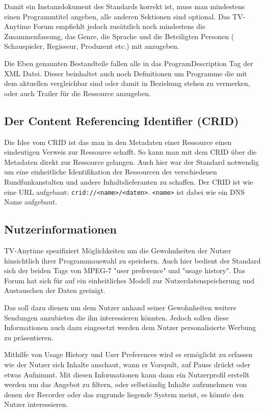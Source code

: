 	Damit ein Instanzdokument des Standards korrekt ist, muss man mindestens einen Programmtitel angeben, alle anderen Sektionen sind optional. Das TV-Anytime Forum empfiehlt jedoch zusätzlich noch mindestens die Zusammenfassung, das Genre, die Sprache und die Beteiligten Personen ( Schauspieler, Regisseur, Produzent etc.) mit anzugeben.
	
	Die Eben genannten Bestandteile fallen alle in das ProgramDescription Tag der XML Datei. Dieser beinhaltet auch noch Definitionen um Programme die mit dem aktuellen vergleichbar sind oder damit in Beziehung stehen zu vermerken, oder auch Trailer für die Ressource anzugeben.
 
 \subsection{Der Content Referencing Identifier (CRID)}
	Die Idee vom CRID ist das man in den Metadaten einer Ressource einen eindeutigen Verweis zur Ressource schafft. So kann man mit dem CRID über die Metadaten direkt zur Ressource gelangen. Auch hier war der Standard notwendig um eine einheitliche Identifikation der Ressourcen der verschiedenen Rundfunkanstalten und andere Inhaltslieferanten zu schaffen. Der CRID ist wie eine URL aufgebaut: \texttt{crid://<name>/<daten>}. \texttt{<name>} ist dabei wie ein DNS Name aufgebaut.

\subsection{Nutzerinformationen} 
	TV-Anytime spezifiziert Möglichkeiten um die Gewohnheiten der Nutzer hinsichtlich ihrer Programmauswahl zu speichern. Auch hier bedient der Standard sich der beiden Tags von MPEG-7 "user preference" und "usage history". Das Forum hat sich für auf ein einheitliches Modell zur Nutzerdatenspeicherung und Austauschen der Daten geeinigt.
	
	Das soll dazu dienen um dem Nutzer anhand seiner Gewohnheiten weitere Sendungen anzubieten die ihn interessieren könnten. Jedoch sollen diese Informationen auch dazu eingesetzt werden dem Nutzer personalisierte Werbung zu präsentieren.
	
	Mithilfe von Usage History und User Preferences wird es ermöglicht zu erfassen wie der Nutzer sich Inhalte anschaut, wann er Vorspult, auf Pause drückt oder etwas Aufnimmt. Mit diesen Informationen kann dann ein Nutzerprofil erstellt werden um das Angebot zu filtern, oder selbständig Inhalte aufzunehmen von denen der Recorder oder das zugrunde liegende System meint, es könnte den Nutzer interessieren.


